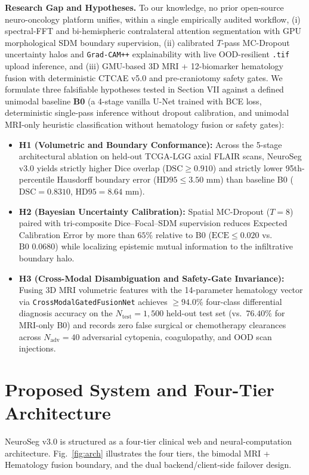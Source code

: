 \documentclass[conference]{IEEEtran}
\begin{document}
\textbf{Research Gap and Hypotheses.} To our knowledge, no prior open-source neuro-oncology platform unifies, within a single empirically audited workflow, (i) spectral-FFT and bi-hemispheric contralateral attention segmentation with GPU morphological SDM boundary supervision, (ii) calibrated $T$-pass MC-Dropout uncertainty halos and \texttt{Grad-CAM++} explainability with live OOD-resilient \texttt{.tif} upload inference, and (iii) GMU-based 3D MRI + 12-biomarker hematology fusion with deterministic CTCAE v5.0 and pre-craniotomy safety gates. We formulate three falsifiable hypotheses tested in Section VII against a defined unimodal baseline \textbf{B0} (a 4-stage vanilla U-Net trained with BCE loss, deterministic single-pass inference without dropout calibration, and unimodal MRI-only heuristic classification without hematology fusion or safety gates):
\begin{itemize}
    \item \textbf{H1 (Volumetric and Boundary Conformance):} Across the 5-stage architectural ablation on held-out TCGA-LGG axial FLAIR scans, NeuroSeg v3.0 yields strictly higher Dice overlap ($\text{DSC} \ge 0.910$) and strictly lower 95th-percentile Hausdorff boundary error ($\text{HD95} \le 3.50\text{ mm}$) than baseline B0 ($\text{DSC} = 0.8310$, $\text{HD95} = 8.64\text{ mm}$).
    \item \textbf{H2 (Bayesian Uncertainty Calibration):} Spatial MC-Dropout ($T = 8$) paired with tri-composite Dice--Focal--SDM supervision reduces Expected Calibration Error by more than $65\%$ relative to B0 ($\text{ECE} \le 0.020$ vs.\ $\text{B0 } 0.0680$) while localizing epistemic mutual information to the infiltrative boundary halo.
    \item \textbf{H3 (Cross-Modal Disambiguation and Safety-Gate Invariance):} Fusing 3D MRI volumetric features with the 14-parameter hematology vector via \texttt{CrossModalGatedFusionNet} achieves $\ge 94.0\%$ four-class differential diagnosis accuracy on the $N_{\text{test}} = 1,500$ held-out test set (vs.\ $76.40\%$ for MRI-only B0) and records zero false surgical or chemotherapy clearances across $N_{\text{adv}} = 40$ adversarial cytopenia, coagulopathy, and OOD scan injections.
\end{itemize}

\section{Proposed System and Four-Tier Architecture}
NeuroSeg v3.0 is structured as a four-tier clinical web and neural-computation architecture. Fig.~\ref{fig:arch} illustrates the four tiers, the bimodal MRI + Hematology fusion boundary, and the dual backend/client-side failover design.
\end{document}
